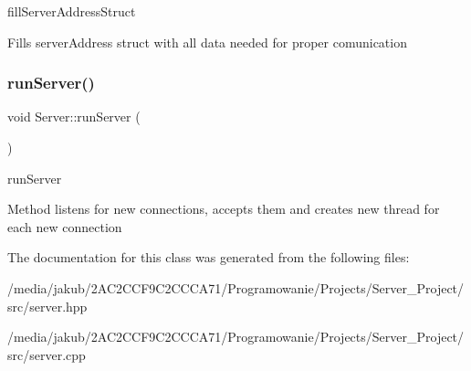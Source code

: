 fill\+Server\+Address\+Struct 

Fills server\+Address struct with all data needed for proper comunication \mbox{\label{classServer_a5dfdd750d32aa4adbb4fdd8ba29b1224}} 
\subsubsection{\texorpdfstring{run\+Server()}{runServer()}}
{\footnotesize\ttfamily void Server\+::run\+Server (\begin{DoxyParamCaption}{ }\end{DoxyParamCaption})}



run\+Server 

Method listens for new connections, accepts them and creates new thread for each new connection 

The documentation for this class was generated from the following files\+:\begin{DoxyCompactItemize}
\item 
/media/jakub/2\+A\+C2\+C\+C\+F9\+C2\+C\+C\+C\+A71/\+Programowanie/\+Projects/\+Server\+\_\+\+Project/src/server.\+hpp\item 
/media/jakub/2\+A\+C2\+C\+C\+F9\+C2\+C\+C\+C\+A71/\+Programowanie/\+Projects/\+Server\+\_\+\+Project/src/server.\+cpp\end{DoxyCompactItemize}
